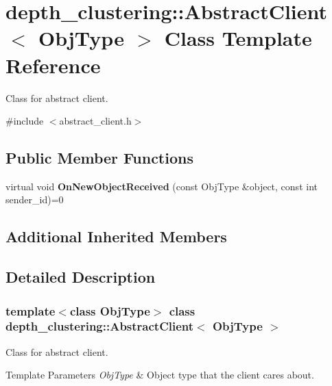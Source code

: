 \hypertarget{classdepth__clustering_1_1AbstractClient}{}\section{depth\+\_\+clustering\+:\+:Abstract\+Client$<$ Obj\+Type $>$ Class Template Reference}
\label{classdepth__clustering_1_1AbstractClient}


Class for abstract client.  




{\ttfamily \#include $<$abstract\+\_\+client.\+h$>$}

\subsection*{Public Member Functions}
\begin{DoxyCompactItemize}
\item 
\mbox{\label{classdepth__clustering_1_1AbstractClient_ad5eedf7017e6c6de4f5741334d6d53ad}} 
virtual void {\bfseries On\+New\+Object\+Received} (const Obj\+Type \&object, const int sender\+\_\+id)=0
\end{DoxyCompactItemize}
\subsection*{Additional Inherited Members}


\subsection{Detailed Description}
\subsubsection*{template$<$class Obj\+Type$>$\newline
class depth\+\_\+clustering\+::\+Abstract\+Client$<$ Obj\+Type $>$}

Class for abstract client. 


\begin{DoxyTemplParams}{Template Parameters}
{\em Obj\+Type} & Object type that the client cares about. \\
\hline
\end{DoxyTemplParams}


